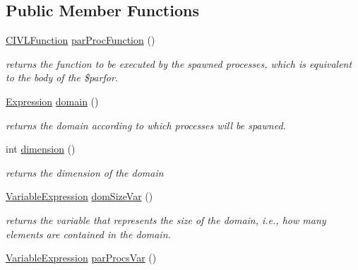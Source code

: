 \subsection*{Public Member Functions}
\begin{DoxyCompactItemize}
\item 
\hyperlink{interfaceedu_1_1udel_1_1cis_1_1vsl_1_1civl_1_1model_1_1IF_1_1CIVLFunction}{C\+I\+V\+L\+Function} \hyperlink{interfaceedu_1_1udel_1_1cis_1_1vsl_1_1civl_1_1model_1_1IF_1_1statement_1_1CivlParForSpawnStatement_a73413feabbb76a8c4c6fea79f209143d}{par\+Proc\+Function} ()
\begin{DoxyCompactList}\small\item\em returns the function to be executed by the spawned processes, which is equivalent to the body of the \$parfor. \end{DoxyCompactList}\item 
\hyperlink{interfaceedu_1_1udel_1_1cis_1_1vsl_1_1civl_1_1model_1_1IF_1_1expression_1_1Expression}{Expression} \hyperlink{interfaceedu_1_1udel_1_1cis_1_1vsl_1_1civl_1_1model_1_1IF_1_1statement_1_1CivlParForSpawnStatement_ae6292a4613e98fb4ca115a5aae72ef40}{domain} ()
\begin{DoxyCompactList}\small\item\em returns the domain according to which processes will be spawned. \end{DoxyCompactList}\item 
int \hyperlink{interfaceedu_1_1udel_1_1cis_1_1vsl_1_1civl_1_1model_1_1IF_1_1statement_1_1CivlParForSpawnStatement_a8bcfe6a11a3da458b362bed9a638296a}{dimension} ()
\begin{DoxyCompactList}\small\item\em returns the dimension of the domain \end{DoxyCompactList}\item 
\hyperlink{interfaceedu_1_1udel_1_1cis_1_1vsl_1_1civl_1_1model_1_1IF_1_1expression_1_1VariableExpression}{Variable\+Expression} \hyperlink{interfaceedu_1_1udel_1_1cis_1_1vsl_1_1civl_1_1model_1_1IF_1_1statement_1_1CivlParForSpawnStatement_ab7af211b7c7ae62d4389732c7b32dd9b}{dom\+Size\+Var} ()
\begin{DoxyCompactList}\small\item\em returns the variable that represents the size of the domain, i.\+e., how many elements are contained in the domain. \end{DoxyCompactList}\item 
\hyperlink{interfaceedu_1_1udel_1_1cis_1_1vsl_1_1civl_1_1model_1_1IF_1_1expression_1_1VariableExpression}{Variable\+Expression} \hyperlink{interfaceedu_1_1udel_1_1cis_1_1vsl_1_1civl_1_1model_1_1IF_1_1statement_1_1CivlParForSpawnStatement_a2de42596c94569b96326e64da14d494c}{par\+Procs\+Var} ()

\end{DoxyCompactItemize}
